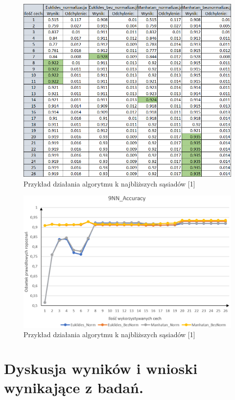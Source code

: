 \documentclass[12pt]{article}
\begin{document}
\begin{figure}[H]
	\centering
		\includegraphics[scale=0.77]{images/distance_metrics/distance_metrics_tab.png}
	\caption{Przykład działania algorytmu k najbliższych sąsiadów [1]}
\end{figure}
\begin{figure}[H]
	\centering
		\includegraphics[scale=0.66]{images/distance_metrics/distance_metrics.png}
	\caption{Przykład działania algorytmu k najbliższych sąsiadów [1]}
\end{figure}


\section{Dyskusja wyników i wnioski wynikające z badań.}
\end{document}
